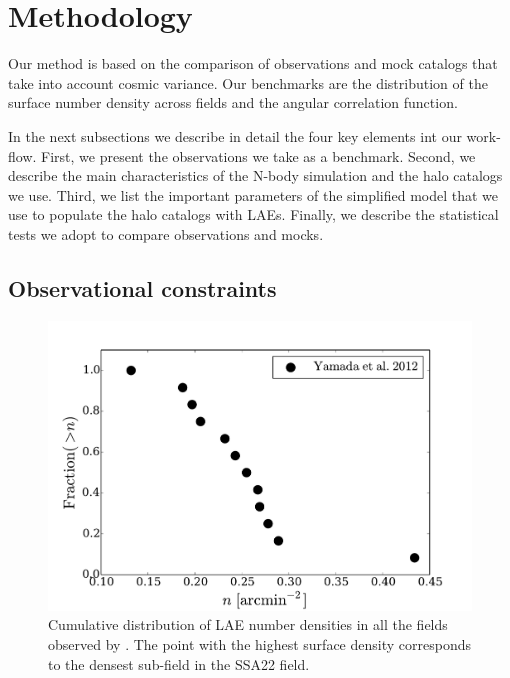 \documentclass{emulateapj}
\begin{document}
\section{Methodology}

Our method is based on the comparison of observations and mock
catalogs that take into account cosmic variance. Our benchmarks are the
distribution of the surface number density across fields and the
angular correlation function.

In the next subsections we describe in detail the four key
elements int our work-flow. First, we present the 
observations we take as a benchmark. Second, we describe the main
characteristics of the N-body simulation and the halo catalogs we
use. Third, we list the important parameters of the simplified
model that we use to populate the halo catalogs with LAEs. Finally, we
describe the statistical tests we adopt to compare observations and mocks.

\subsection{Observational constraints}


\begin{figure}
\begin{center}
\includegraphics[width=0.95\linewidth,angle=0]{Fig1b.pdf}
\caption{ \label{fig:number_density} Cumulative distribution of LAE number
  densities in all the fields observed by \citet{Yamada2012}. The
  point with the highest surface density corresponds to the densest
  sub-field in the SSA22 field.}
\end{center} 
\end{figure}
\end{document}
